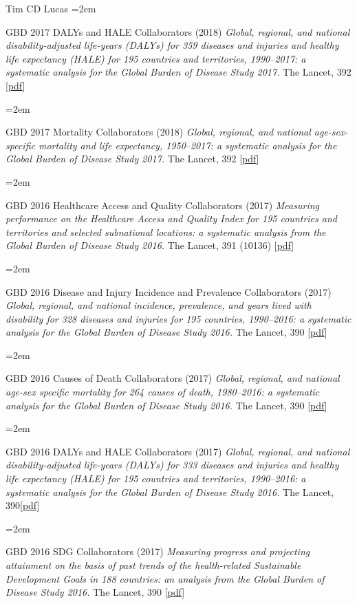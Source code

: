 \documentclass{scrartcl}
\newcommand{\MarginText}[1]{\marginpar{\raggedleft\itshape\small#1}} %
\newcommand{\Description}[1]{\hangindent=2em\hangafter=0\noindent\raggedright\footnotesize{#1}\par\normalsize\vspace{1em}} %
\begin{document}
\begin{cv}{Tim {\Large CD} Lucas}
\Description{GBD 2017 DALYs and HALE Collaborators (2018) \emph{Global, regional, and national disability-adjusted life-years (DALYs) for 359 diseases and injuries and healthy life expectancy (HALE) for 195 countries and territories, 1990--2017: a systematic analysis for the Global Burden of Disease Study 2017.} The Lancet, 392 [\href{https://www.sciencedirect.com/science/article/pii/S0140673618318919/pdfft?md5=e63230d66805f99e38a7dc60873c7bf0&pid=1-s2.0-S0140673618318919-main.pdf}{pdf}]}

\Description{GBD 2017 Mortality Collaborators (2018) \emph{Global, regional, and national age-sex-specific mortality and life expectancy, 1950--2017: a systematic analysis for the Global Burden of Disease Study 2017.} The Lancet, 392 [\href{https://www.sciencedirect.com/science/article/pii/S0140673618323353/pdfft?md5=06fd82a2bba62e2be2849270cc28fe17&pid=1-s2.0-S0140673618323353-main.pdf}{pdf}]}

\Description{GBD 2016 Healthcare Access and Quality Collaborators (2017) \emph{Measuring performance on the Healthcare Access and Quality Index for 195 countries and territories and selected subnational locations: a systematic analysis from the Global Burden of Disease Study 2016.} The Lancet, 391 (10136) [\href{https://www.thelancet.com/action/showPdf?pii=S0140-6736\%2817\%2932336-X}{pdf}]}



\Description{\MarginText{2017}GBD 2016 Disease and Injury Incidence and Prevalence Collaborators (2017) \emph{Global, regional, and national incidence, prevalence, and years lived with disability for 328 diseases and injuries for 195 countries, 1990--2016: a systematic analysis for the Global Burden of Disease Study 2016.} The Lancet, 390 [\href{https://www.thelancet.com/action/showPdf?pii=S0140-6736\%2817\%2932154-2}{pdf}]}

\Description{GBD 2016 Causes of Death Collaborators (2017) \emph{Global, regional, and national age-sex specific mortality for 264 causes of death, 1980--2016: a systematic analysis for the Global Burden of Disease Study 2016.} The Lancet, 390 [\href{https://www.thelancet.com/action/showPdf?pii=S0140-6736\%2817\%2932152-9}{pdf}]}

\Description{GBD 2016 DALYs and HALE Collaborators (2017) \emph{Global, regional, and national disability-adjusted life-years (DALYs) for 333 diseases and injuries and healthy life expectancy (HALE) for 195 countries and territories, 1990--2016: a systematic analysis for the Global Burden of Disease Study 2016.} The Lancet, 390[\href{https://www.thelancet.com/action/showPdf?pii=S0140-6736\%2817\%2932130-X}{pdf}]}

\Description{GBD 2016 SDG Collaborators (2017) \emph{Measuring progress and projecting attainment on the basis of past trends of the health-related Sustainable Development Goals in 188 countries: an analysis from the Global Burden of Disease Study 2016.} The Lancet, 390 [\href{https://www.thelancet.com/action/showPdf?pii=S0140-6736\%2817\%2932336-X}{pdf}]}



\end{cv}
\end{document}

